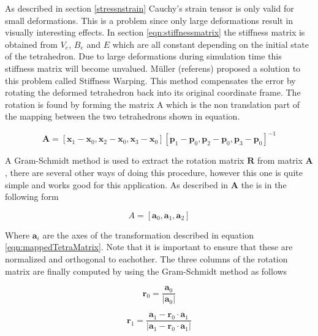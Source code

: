 As described in section \ref{stressnstrain} Cauchy’s strain tensor is only valid for small deformations. This is a problem since only large deformations result in visually interesting effects. In section \ref{eqn:stiffnessmatrix} the stiffness matrix is obtained from $V_{e}$, $B_{e}$ and $E$ which are all constant depending on the initial state of the tetrahedron. Due to large deformations during simulation time this stiffness matrix will become unvalued. M\"uller (referens) proposed a solution to this problem called Stiffness Warping. This method compensates the error by rotating the deformed tetrahedron back into its original coordinate frame. The rotation is found by forming the matrix A which is the non translation part of the mapping between the two tetrahedrons shown in equation.

\begin{equation}\label{eqn:mappedTetraMatrix}
    \mathbf{A} = [\mathbf{x}_{1}-\mathbf{x}_{0}, \mathbf{x}_{2}-\mathbf{x}_{0}, \mathbf{x}_{3}-\mathbf{x}_{0}][\mathbf{p}_{1}-\mathbf{p}_{0}, \mathbf{p}_{2}-\mathbf{p}_{0}, \mathbf{p}_{3}-\mathbf{p}_{0}]^{-1}
\end{equation}

A Gram-Schmidt method is used to extract the rotation matrix $\mathbf{R}$  from matrix $\mathbf{A}$ , there are several other ways of doing this procedure, however this one is quite simple and works good for this application. As described in \cite{rt_phys} $\mathbf{A}$ the is in the following form

\begin{equation}\label{eqn:transformationAxes}
    A =[\mathbf{a}_0, \mathbf{a}_1,\mathbf{a}_2]
\end{equation}

Where $\mathbf{a}_i$ are the axes of the transformation described in equation \ref{eqn:mappedTetraMatrix}. Note that it is important to ensure that these are normalized and orthogonal to eachother. The three columns of the rotation matrix are finally computed by using the Gram-Schmidt method as follows

\begin{equation}\label{eqn:r0}
    \mathbf{r}_0 = \frac{\mathbf{a}_0}{| \mathbf{a}_0 |}
\end{equation}

\begin{equation}\label{eqn:r1}
    \mathbf{r}_1 = \frac{\mathbf{a}_1 -  \mathbf{r}_0 \cdot \mathbf{a}_1}{| \mathbf{a}_1 -  \mathbf{r}_0 \cdot \mathbf{a}_1 |}
\end{equation}

